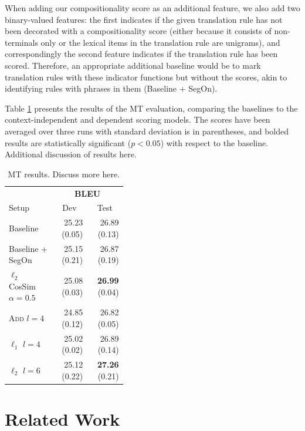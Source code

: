 \documentclass[11pt,letterpaper]{article}
\begin{document}
When adding our compositionality score as an additional feature, we also add two binary-valued features: the first indicates if the given translation rule has not been decorated with a compositionality score (either because it consists of non-terminals only or the lexical items in the translation rule are unigrams), and correspondingly the second feature indicates if the translation rule has been scored. 
Therefore, an appropriate additional baseline would be to mark translation rules with these indicator functions but without the scores, akin to identifying rules with phrases in them (Baseline + SegOn). 

Table \ref{tab:mt-results} presents the results of the MT evaluation, comparing the baselines to the context-independent and dependent scoring models. 
The scores have been averaged over three runs with standard deviation is in parentheses, and bolded results are statistically significant ($p < 0.05$) with respect to the baseline. 
Additional discussion of results here. 

\begin{table}[h!]
  \begin{center}
    \begin{tabular}{p{0.4\linewidth}rr}
      \hline
	  & \multicolumn{2}{c}{\bf BLEU} \\
      Setup &  \multicolumn{1}{c}{Dev} & \multicolumn{1}{c}{Test} \\
	  \hline
	  Baseline & 25.23 (0.05) & 26.89 (0.13) \\
      Baseline + SegOn & 25.15 (0.21) & 26.87 (0.19) \\
	  $\ell_2$ CosSim $\alpha=0.5$ &  25.08 (0.03) & {\bf26.99} (0.04) \\
  	  \textsc{Add} $l=4$ &  24.85 (0.12) & 26.82 (0.05) \\
      $\ell_1$ $l=4$ &  25.02 (0.02) & 26.89 (0.14) \\
	  $\ell_2$  $l=6$ & 25.12 (0.22) & {\bf 27.26} (0.21) \\
	\end{tabular}
  \end{center}
  \caption{MT results. Discuss more here.}
  \label{tab:mt-results}
\end{table}

\section{Related Work}
\end{document}
